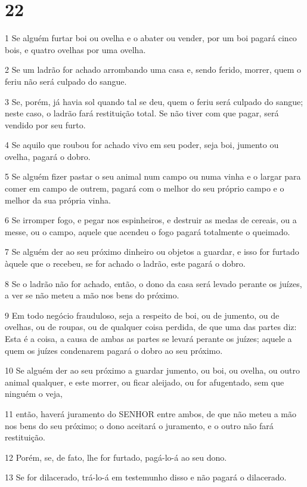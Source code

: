 \chapter{22}

\par 1 Se alguém furtar boi ou ovelha e o abater ou vender, por um boi pagará cinco bois, e quatro ovelhas por uma ovelha.
\par 2 Se um ladrão for achado arrombando uma casa e, sendo ferido, morrer, quem o feriu não será culpado do sangue.
\par 3 Se, porém, já havia sol quando tal se deu, quem o feriu será culpado do sangue; neste caso, o ladrão fará restituição total. Se não tiver com que pagar, será vendido por seu furto.
\par 4 Se aquilo que roubou for achado vivo em seu poder, seja boi, jumento ou ovelha, pagará o dobro.
\par 5 Se alguém fizer pastar o seu animal num campo ou numa vinha e o largar para comer em campo de outrem, pagará com o melhor do seu próprio campo e o melhor da sua própria vinha.
\par 6 Se irromper fogo, e pegar nos espinheiros, e destruir as medas de cereais, ou a messe, ou o campo, aquele que acendeu o fogo pagará totalmente o queimado.
\par 7 Se alguém der ao seu próximo dinheiro ou objetos a guardar, e isso for furtado àquele que o recebeu, se for achado o ladrão, este pagará o dobro.
\par 8 Se o ladrão não for achado, então, o dono da casa será levado perante os juízes, a ver se não meteu a mão nos bens do próximo.
\par 9 Em todo negócio frauduloso, seja a respeito de boi, ou de jumento, ou de ovelhas, ou de roupas, ou de qualquer coisa perdida, de que uma das partes diz: Esta é a coisa, a causa de ambas as partes se levará perante os juízes; aquele a quem os juízes condenarem pagará o dobro ao seu próximo.
\par 10 Se alguém der ao seu próximo a guardar jumento, ou boi, ou ovelha, ou outro animal qualquer, e este morrer, ou ficar aleijado, ou for afugentado, sem que ninguém o veja,
\par 11 então, haverá juramento do SENHOR entre ambos, de que não meteu a mão nos bens do seu próximo; o dono aceitará o juramento, e o outro não fará restituição.
\par 12 Porém, se, de fato, lhe for furtado, pagá-lo-á ao seu dono.
\par 13 Se for dilacerado, trá-lo-á em testemunho disso e não pagará o dilacerado.
